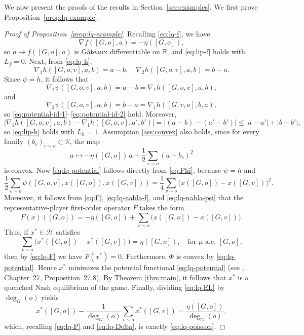 \documentclass[11pt]{article}
\newcommand{\be}{\begin{equation}}
\newcommand{\ee}{\end{equation}}
\numberwithin{equation}{section}
\begin{document}
We now present the proofs of the results in Section~\ref{sec:examples}. We first prove Proposition~\ref{prop:lq-example}.
\begin{proof}[Proof of Proposition~\ref{prop:lq-example}]
Recalling \eqref{eq:lq-f}, we have
\be\label{eq:lq-nabla-f}
\nabla f([G,o],a)=-\eta([G,o]),
\ee
so \(a\mapsto f([G,o],a)\) is G\^ateaux differentiable on \(\mathbb R\), and \eqref{eq:lip-f} holds with \(L_f=0\). Next, from \eqref{eq:lq-h},
\[
\nabla_1 h([G,o,v],a,b)=a-b,
\quad
\nabla_2 h([G,o,v],a,b)=b-a.
\]
Since \(\psi=h\), it follows that
\be\label{eq:lq-nabla-psi}
\nabla_1\psi([G,o,v],a,b)=a-b=\nabla_1 h([G,o,v],a,b),
\ee
and
\[
\nabla_2\psi([G,o,v],a,b)=b-a=\nabla_1 h([G,v,o],b,a),
\]
so \eqref{eq:potential-id-1}--\eqref{eq:potential-id-2} hold. Moreover,
\[
|\nabla_1 h([G,o,v],a,b)-\nabla_1 h([G,o,v],a',b')|
=
|(a-b)-(a'-b')|
\le |a-a'|+|b-b'|,
\]
so \eqref{eq:lip-h} holds with \(L_h=1\). Assumption \ref{ass:convex} also holds, since for every family \((b_v)_{v\sim o}\subset\mathbb R\), the map
\[
a\mapsto -\eta([G,o])\,a+\frac12\sum_{v\sim o}(a-b_v)^2
\]
is convex. Now \eqref{eq:lq-potential} follows directly from \eqref{eq:Phi}, because \(\psi=h\) and
\[
\frac12\sum_{v\sim o}\psi([G,o,v],x([G,o]),x([G,v]))
=
\frac14\sum_{v\sim o}\big(x([G,o])-x([G,v])\big)^2.
\]
Moreover, it follows from \eqref{eq:F}, \eqref{eq:lq-nabla-f}, and \eqref{eq:lq-nabla-psi} that the representative-player first-order operator \(F\) takes the form
\begin{equation}\label{eq:lq-F}
F(x)([G,o])
=
-\eta([G,o])+\sum_{v\sim o}\big(x([G,o])-x([G,v])\big).
\end{equation}
Thus, if \(x^\ast\in\mathcal{H}\) satisfies 
\begin{equation}\label{eq:lq-EL}
\sum_{v\sim o}\big(x^\ast([G,o])-x^\ast([G,v])\big)=\eta([G,o]),
\quad \text{for } \mu\text{-a.e. } [G,o],
\end{equation}
then by \eqref{eq:lq-F} we have \(F(x^\ast)=0\). Furthermore, \(\Phi\) is convex by \eqref{eq:lq-potential}. Hence \(x^\ast\) minimizes the potential functional \eqref{eq:lq-potential} (see \cite{bauschke2017}, Chapter~27, Proposition~27.8). By Theorem \ref{thm:main}, it follows that \(x^\ast\) is a quenched Nash equilibrium of the game. Finally, dividing \eqref{eq:lq-EL} by \(\deg_G(o)\) yields
\[
x^\ast([G,o])-\frac1{\deg_G(o)}\sum_{v\sim o}x^\ast([G,v])
=
\frac{\eta([G,o])}{\deg_G(o)},
\]
which, recalling \eqref{eq:lq-P} and \eqref{eq:lq-Delta}, is exactly \eqref{eq:lq-poisson}.
\end{proof}
\end{document}
